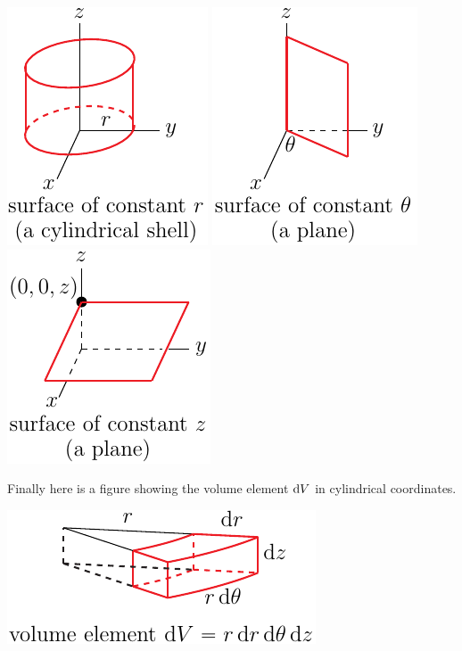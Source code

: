 \begin{wfig}
\begin{center}
    \includegraphics{cyl3.pdf}\qquad
    \includegraphics{cyl4.pdf}\qquad
    \includegraphics{cyl2.pdf}
\end{center}
\end{wfig}
Finally here is a figure showing the volume element $\mathrm{d}V$ in
cylindrical coordinates.
\begin{efig}
\begin{center}
    \includegraphics{cyl5.pdf}
\end{center}
\end{efig}





